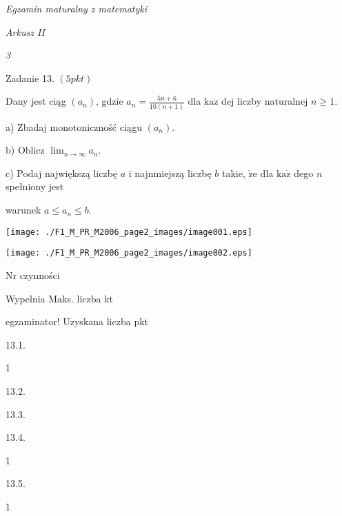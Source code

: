 \documentclass[a4paper,12pt]{article}
\begin{document}
{\it Egzamin maturalny z matematyki}

{\it Arkusz II}

{\it 3}

Zadanie 13. $(5pkt)$

Dany jest ciąg $(a_{n})$, gdzie $a_{n}=\displaystyle \frac{5n+6}{10(n+1)}$ dla $\mathrm{k}\mathrm{a}\dot{\mathrm{z}}$ dej liczby naturalnej $n\geq 1.$

a) Zbadaj monotoniczność ciągu $(a_{n}).$

b) Oblicz $\displaystyle \lim_{n\rightarrow\infty}a_{n}.$

c) Podaj największą liczbę $a$ i najnmiejszą liczbę $b$ takie, $\dot{\mathrm{z}}\mathrm{e}$ dla $\mathrm{k}\mathrm{a}\dot{\mathrm{z}}$ dego $n$ spełniony jest

warunek $a\leq a_{n}\leq b.$
\begin{center}
\texttt{[image: ./F1\_M\_PR\_M2006\_page2\_images/image001.eps]}

\texttt{[image: ./F1\_M\_PR\_M2006\_page2\_images/image002.eps]}
\end{center}
Nr czynności

Wypelnia Maks. liczba kt

egzaminator! Uzyskana liczba pkt

13.1.

1

13.2.

13.3.

13.4.

1

13.5.

1
\end{document}
